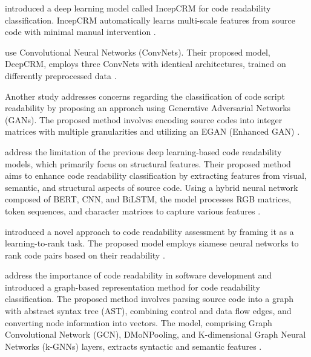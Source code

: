\documentclass[%
class=scrreprt,
chapterprefix=false,%
open=right,%
twoside=false,%
paper=a4,%
logofile={Logo\_zentral\_farbig\_EN.png},%
thesistype=master,%
UKenglish,%
]{se2thesis}
\theoremstyle{definition}
\begin{document}
	\citeauthor{mi2018inception} introduced a deep learning model called IncepCRM for code readability classification. IncepCRM automatically learns multi-scale features from source code with minimal manual intervention \cite{mi2018inception}.
	
	\citeauthor{mi2018improving} use Convolutional Neural Networks (ConvNets). Their proposed model, DeepCRM, employs three ConvNets with identical architectures, trained on differently preprocessed data \cite{mi2018improving}.
		
	Another study addresses concerns regarding the classification of code script readability by proposing an approach using Generative Adversarial Networks (GANs). The proposed method involves encoding source codes into integer matrices with multiple granularities and utilizing an EGAN (Enhanced GAN) \cite{sharma2020egan}.
	
	\citeauthor{mi2022towards} address the limitation of the previous deep learning-based code readability models, which primarily focus on structural features. Their proposed method aims to enhance code readability classification by extracting features from visual, semantic, and structural aspects of source code. Using a hybrid neural network composed of BERT, CNN, and BiLSTM, the model processes RGB matrices, token sequences, and character matrices to capture various features \cite{mi2022towards}.
	
	\citeauthor{mi2022rank} introduced a novel approach to code readability assessment by framing it as a learning-to-rank task. The proposed model employs siamese neural networks to rank code pairs based on their readability \cite{mi2022rank}.

	\citeauthor{mi2023graph} address the importance of code readability in software development and introduced a graph-based representation method for code readability classification. The proposed method involves parsing source code into a graph with abstract syntax tree (AST), combining control and data flow edges, and converting node information into vectors. The model, comprising Graph Convolutional Network (GCN), DMoNPooling, and K-dimensional Graph Neural Networks (k-GNNs) layers, extracts syntactic and semantic features \cite{mi2023graph}.
\end{document}
